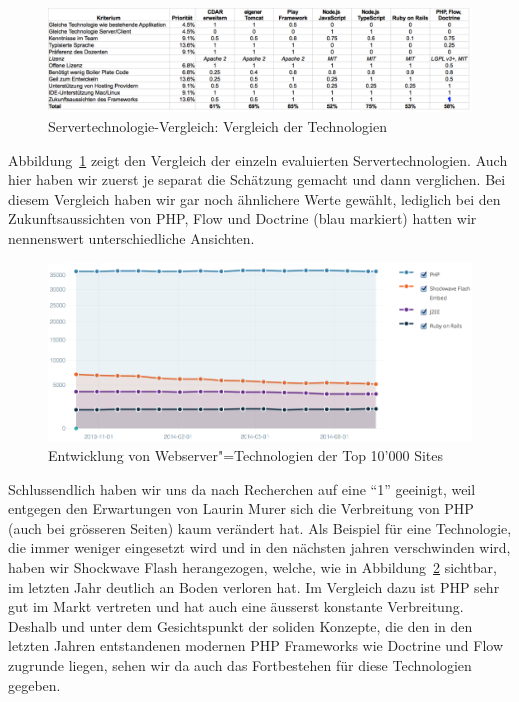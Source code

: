 			\begin{figure}[H]
				\begin{minipage}[b]{\linewidth}
					\includegraphics[width=\textwidth]{media/spreadsheets/ServertechnologieVergleichVergleichDerTechnologien.pdf}
					\centering
					\caption{Servertechnologie-Vergleich: Vergleich der Technologien}
					\label{fig:ServertechnologieVergleichVergleichDerTechnologien.pdf}
				\end{minipage}
			\end{figure}
			
			Abbildung~\ref{fig:ServertechnologieVergleichVergleichDerTechnologien.pdf} zeigt den Vergleich der einzeln evaluierten Servertechnologien.
			Auch hier haben wir zuerst je separat die Schätzung gemacht und dann verglichen.
			Bei diesem Vergleich haben wir gar noch ähnlichere Werte gewählt, lediglich bei den Zukunftsaussichten von PHP, Flow und Doctrine (blau markiert) hatten wir nennenswert unterschiedliche Ansichten.
			
			\begin{figure}
					\includegraphics[width=\textwidth]{media/img/EntwicklungVonWebserverTechnologien.png}
					\centering
					\caption{Entwicklung von Webserver"=Technologien der Top 10'000 Sites \cite{builtwith_pty_ltd_framework_2014}}
					\label{fig:EntwicklungVonWebserverTechnologien}
			\end{figure}
			
			Schlussendlich haben wir uns da nach Recherchen auf eine "`1"' geeinigt, weil entgegen den Erwartungen von Laurin Murer sich die Verbreitung von PHP (auch bei grösseren Seiten) kaum verändert hat.
			Als Beispiel für eine Technologie, die immer weniger eingesetzt wird und in den nächsten jahren verschwinden wird, haben wir Shockwave Flash herangezogen, welche, wie in Abbildung~\ref{fig:EntwicklungVonWebserverTechnologien} sichtbar, im letzten Jahr deutlich an Boden verloren hat.
			Im Vergleich dazu ist PHP sehr gut im Markt vertreten und hat auch eine äusserst konstante Verbreitung.
			Deshalb und unter dem Gesichtspunkt der soliden Konzepte, 
			die den in den letzten Jahren entstandenen modernen PHP Frameworks wie Doctrine und Flow zugrunde liegen, sehen wir da auch das Fortbestehen für diese Technologien gegeben.
			

